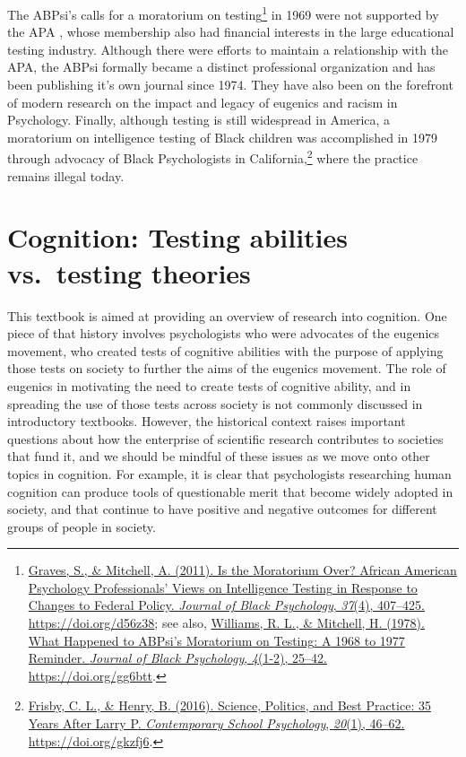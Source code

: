 \documentclass[
  oneside,
  12pt]{crumpbook}
\begin{document}
The ABPsi's calls for a moratorium on testing\footnote{\protect\hyperlink{ref-gravesMoratoriumAfricanAmerican2011}{Graves, S., \& Mitchell, A. (2011). Is the {Moratorium Over}? {African American Psychology Professionals}' {Views} on {Intelligence Testing} in {Response} to {Changes} to {Federal Policy}. \emph{Journal of Black Psychology}, \emph{37}(4), 407--425. \url{https://doi.org/d56z38}}; see also, \protect\hyperlink{ref-williamsWhatHappenedABPsi1978}{Williams, R. L., \& Mitchell, H. (1978). What {Happened} to {ABPsi}'s {Moratorium} on {Testing}: {A} 1968 to 1977 {Reminder}. \emph{Journal of Black Psychology}, \emph{4}(1-2), 25--42. \url{https://doi.org/gg6btt}}.} in 1969 were not supported by the APA , whose membership also had financial interests in the large educational testing industry. Although there were efforts to maintain a relationship with the APA, the ABPsi formally became a distinct professional organization and has been publishing it's own journal since 1974. They have also been on the forefront of modern research on the impact and legacy of eugenics and racism in Psychology. Finally, although testing is still widespread in America, a moratorium on intelligence testing of Black children was accomplished in 1979 through advocacy of Black Psychologists in California,\footnote{\protect\hyperlink{ref-frisbySciencePoliticsBest2016}{Frisby, C. L., \& Henry, B. (2016). Science, {Politics}, and {Best Practice}: 35 {Years After Larry P}. \emph{Contemporary School Psychology}, \emph{20}(1), 46--62. \url{https://doi.org/gkzfj6}}.} where the practice remains illegal today.

\hypertarget{cognition-testing-abilities-vs.-testing-theories}{%
\section{Cognition: Testing abilities vs.~testing theories}\label{cognition-testing-abilities-vs.-testing-theories}}

This textbook is aimed at providing an overview of research into cognition. One piece of that history involves psychologists who were advocates of the eugenics movement, who created tests of cognitive abilities with the purpose of applying those tests on society to further the aims of the eugenics movement. The role of eugenics in motivating the need to create tests of cognitive ability, and in spreading the use of those tests across society is not commonly discussed in introductory textbooks. However, the historical context raises important questions about how the enterprise of scientific research contributes to societies that fund it, and we should be mindful of these issues as we move onto other topics in cognition. For example, it is clear that psychologists researching human cognition can produce tools of questionable merit that become widely adopted in society, and that continue to have positive and negative outcomes for different groups of people in society.
\end{document}
